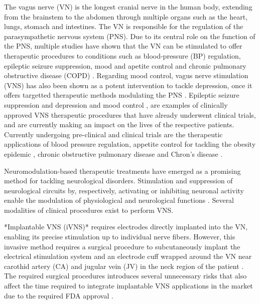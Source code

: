 \par
The vagus nerve (VN) is the longest cranial nerve in the human body, extending
from the brainstem to the abdomen through multiple organs such as the heart,
lungs, stomach and intestines. The VN is responsible for the regulation of the
parasympathetic nervous system (PNS). Due to its central role on the function of the
PNS, multiple studies have shown that the VN can be stimulated to offer therapeutic
procedures to conditions such as blood-pressure (BP) regulation, epileptic seizure
suppression, mood and apetite control and chronic pulmonary obstructive disease
(COPD) \cite[*]{Goggins2022, Ji2020, Lescrauwaet2022, Browning2017, Undem2005}. 
Regarding mood control, vagus nerve stimulation (VNS) has also been shown as a potent intervention to tackle depression, once it offers targetted therapeutic methods modulating the PNS \cite{DepressionVNS}. Epileptic seizure suppression \cite{} and depression and mood control \cite{}, are examples of clinically approved VNS therapeutic procedures that have already underwent clinical trials, and are currently making an impact on the lives of the respective patients. Currently undergoing pre-clinical and clinical trials are the therapeutic applications of blood pressure regulation, appetite control for tackling the obesity epidemic \cite{},  chronic obstructive pulmonary disease \cite{} and Chron's disease \cite{}. 

\par
Neuromodulation-based therapeutic treatments have emerged as a promising method 
for tackling neurological disorders. Stimulation and suppression of neurological circuits by, respectively, activating or inhibiting neuronal activity enable the modulation of physiological and neurological functions \cite{Fomenko2018,Dalecki2004}. Several modalities of clinical procedures exist to perform VNS. 

\begin{figure}[ht]
  \centering
  \label{fig:implantable_electrode_vns}
\end{figure}

*Implantable VNS (iVNS)* requires electrodes directly implanted into 
the VN, enabling its precise stimulation up to individual nerve fibers. 
However, this invasive method requires a surgical procedure to subcutaneously 
implant the electrical stimulation system and an electrode cuff wrapped around 
the VN near carothid artery (CA) and jugular vein (JV) in the neck region of the 
patient \cite{}. The required surgical procedures introduces several unnecessary risks that 
also affect the time required to integrate implantable VNS applications in the market due to the 
required FDA approval \cite{}. 

